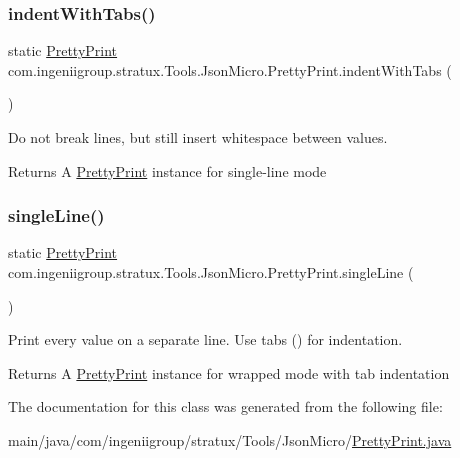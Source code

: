 \subsubsection{\texorpdfstring{indent\+With\+Tabs()}{indentWithTabs()}}
{\footnotesize\ttfamily static \hyperlink{classcom_1_1ingeniigroup_1_1stratux_1_1_tools_1_1_json_micro_1_1_pretty_print}{Pretty\+Print} com.\+ingeniigroup.\+stratux.\+Tools.\+Json\+Micro.\+Pretty\+Print.\+indent\+With\+Tabs (\begin{DoxyParamCaption}{ }\end{DoxyParamCaption})\hspace{0.3cm}{\ttfamily [static]}}

Do not break lines, but still insert whitespace between values.

\begin{DoxyReturn}{Returns}
A \hyperlink{classcom_1_1ingeniigroup_1_1stratux_1_1_tools_1_1_json_micro_1_1_pretty_print}{Pretty\+Print} instance for single-\/line mode 
\end{DoxyReturn}
\mbox{\label{classcom_1_1ingeniigroup_1_1stratux_1_1_tools_1_1_json_micro_1_1_pretty_print_ac1ed501e1b091bd8f45030c1943ca60d}} 
\subsubsection{\texorpdfstring{single\+Line()}{singleLine()}}
{\footnotesize\ttfamily static \hyperlink{classcom_1_1ingeniigroup_1_1stratux_1_1_tools_1_1_json_micro_1_1_pretty_print}{Pretty\+Print} com.\+ingeniigroup.\+stratux.\+Tools.\+Json\+Micro.\+Pretty\+Print.\+single\+Line (\begin{DoxyParamCaption}{ }\end{DoxyParamCaption})\hspace{0.3cm}{\ttfamily [static]}}

Print every value on a separate line. Use tabs ({\ttfamily }) for indentation.

\begin{DoxyReturn}{Returns}
A \hyperlink{classcom_1_1ingeniigroup_1_1stratux_1_1_tools_1_1_json_micro_1_1_pretty_print}{Pretty\+Print} instance for wrapped mode with tab indentation 
\end{DoxyReturn}


The documentation for this class was generated from the following file\+:\begin{DoxyCompactItemize}
\item 
main/java/com/ingeniigroup/stratux/\+Tools/\+Json\+Micro/\hyperlink{_pretty_print_8java}{Pretty\+Print.\+java}\end{DoxyCompactItemize}
